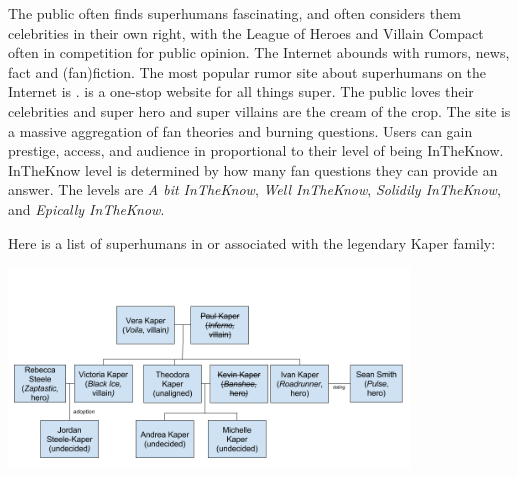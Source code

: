 \documentclass[blue]{LRSguildcamp1}
\begin{document}
The public often finds superhumans fascinating, and often considers them celebrities in their own right, with the League of Heroes and Villain Compact often in competition for public opinion.  The Internet abounds with rumors, news, fact and (fan)fiction.  The most popular rumor site about superhumans on the Internet is \pTweenwebsite{}. \pTweenwebsite{} is a one-stop website for all things super. The public loves their celebrities and super hero and super villains are the cream of the crop. The site is a massive aggregation of fan theories and burning questions. Users can gain prestige, access, and audience in proportional to their level of being InTheKnow. InTheKnow level is determined by how many fan questions they can provide an answer. The levels are \textit{A bit InTheKnow}, \textit{Well InTheKnow}, \textit{Solidily InTheKnow}, and \textit{Epically InTheKnow}.

Here is a list of superhumans in or associated with the legendary Kaper family:

\includegraphics[width=0.8\textwidth]{Familytree.png}
\end{document}
